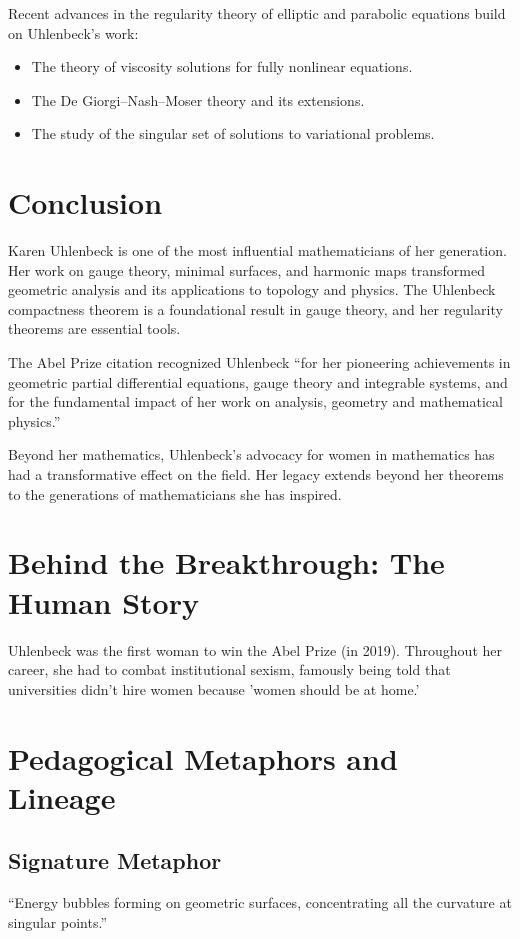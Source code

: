 Recent advances in the regularity theory of elliptic and parabolic equations build on Uhlenbeck's work:
\begin{itemize}
\item The theory of viscosity solutions for fully nonlinear equations.
\item The De Giorgi--Nash--Moser theory and its extensions.
\item The study of the singular set of solutions to variational problems.
\end{itemize}

\section{Conclusion}

Karen Uhlenbeck is one of the most influential mathematicians of her generation. Her work on gauge theory, minimal surfaces, and harmonic maps transformed geometric analysis and its applications to topology and physics. The Uhlenbeck compactness theorem is a foundational result in gauge theory, and her regularity theorems are essential tools.

The Abel Prize citation recognized Uhlenbeck ``for her pioneering achievements in geometric partial differential equations, gauge theory and integrable systems, and for the fundamental impact of her work on analysis, geometry and mathematical physics.''

Beyond her mathematics, Uhlenbeck's advocacy for women in mathematics has had a transformative effect on the field. Her legacy extends beyond her theorems to the generations of mathematicians she has inspired.


\section{Behind the Breakthrough: The Human Story}
Uhlenbeck was the first woman to win the Abel Prize (in 2019). Throughout her career, she had to combat institutional sexism, famously being told that universities didn't hire women because 'women should be at home.'

\section{Pedagogical Metaphors and Lineage}
\subsection{Signature Metaphor}
``Energy bubbles forming on geometric surfaces, concentrating all the curvature at singular points.''

